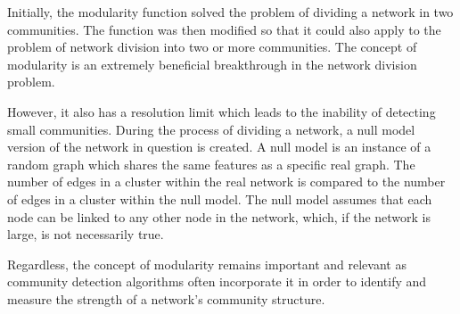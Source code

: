 Initially, the modularity function solved the problem of dividing a network in two communities. The function was then modified so that it could also apply to the problem of network division into two or more communities. The concept of modularity is an extremely beneficial breakthrough in the network division problem.

However, it also has a resolution limit which leads to the inability of detecting small communities. During the process of dividing a network, a null model version of the network in question is created. A null model is an instance of a random graph which shares the same features as a specific real graph. The number of edges in a cluster within the real network is compared to the number of edges in a cluster within the null model. The null model assumes that each node can be linked to any other node in the network, which, if the network is large, is not necessarily true. 

Regardless, the concept of modularity remains important and relevant as community detection algorithms often incorporate it in order to identify and measure the strength of a network's community structure.